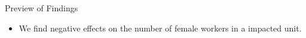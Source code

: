 \begin{frame}{Preview of Findings}
    \begin{itemize}
        \item We find negative effects on the number of female workers in a impacted unit.

    \end{itemize}
\end{frame}